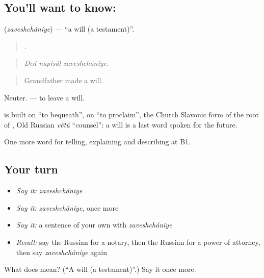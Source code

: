 \subsection*{You'll want to know: }
\textbf{} (\emph{zaveshchániye}) — \textquotedblleft{}a will (a testament)\textquotedblright{}.

\begin{quote}
  .
\end{quote}

\begin{quote}
\emph{Ded napisál zaveshchániye.}
\end{quote}

\begin{quote}
Grandfather made a will.
\end{quote}

Neuter. \emph{ } — to leave a will.

\begin{cousinweb}
\textbf{} is built on \emph{} \textquotedblleft{}to bequeath\textquotedblright{}, on \emph{} \textquotedblleft{}to proclaim\textquotedblright{}, the Church Slavonic form of the root of \emph{}, Old Russian \emph{větŭ} \textquotedblleft{}counsel\textquotedblright{}: a will is a last word spoken for the future.
\end{cousinweb}

\begin{grammarlens}[title={What you've built}]
One more word for telling, explaining and describing at B1.
\end{grammarlens}

\subsection*{Your turn}
\begin{itemize}
\raggedright
  \item \emph{Say it:} \emph{zaveshchániye}
  \item \emph{Say it:} \emph{zaveshchániye}, once more
  \item \emph{Say it:} a sentence of your own with \emph{zaveshchániye}
  \item \emph{Recall:} say the Russian for a notary, then the Russian for a power of attorney, then say \emph{zaveshchániye} again
\end{itemize}

\begin{tcolorbox}[breakable,colback=teal!4,colframe=teal!35!black,title={Before you move on}]
What does  mean? (\textquotedblleft{}A will (a testament)\textquotedblright{}.) Say it once more.
\end{tcolorbox}
